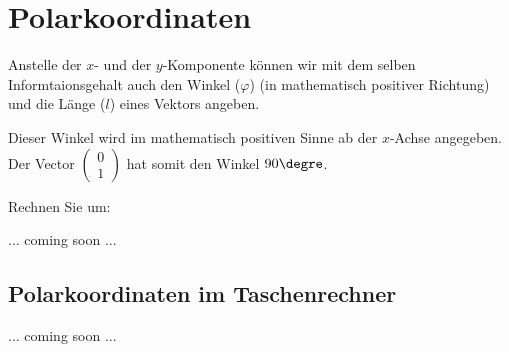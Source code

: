 
\section{Polarkoordinaten}

Anstelle der $x$- und der $y$-Komponente können wir mit dem selben
Informtaionsgehalt auch den Winkel ($\varphi$)
(in mathematisch positiver Richtung) und die Länge ($l$) eines Vektors
angeben.


Dieser Winkel wird im mathematisch positiven Sinne ab der $x$-Achse
angegeben. Der Vector
$\begin{pmatrix}0\\1\end{pmatrix}$ hat somit den Winkel $90\degre$.

Rechnen Sie um:

... coming soon ...


\subsection{Polarkoordinaten im Taschenrechner}

... coming soon ...
